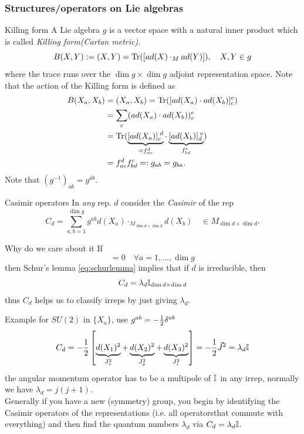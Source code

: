 \subsubsection{Structures/operators on Lie algebras}
\begin{mybox}{Killing form}
	A Lie algebra $g$ is a vector space with a natural inner product which is called \emph{Killing form(Cartan metric)}.
	\begin{equation}
		\label{eq:killingform}
		B(X,Y) := (X,Y) = \mathrm{Tr}([ad(X) \cdot_M ad(Y)]), \quad X,Y\in g
	\end{equation}
	where the trace runs over the $\dim g \times \dim g$ adjoint representation space. Note that the action of the Killing form is defined as
	\begin{align*}
		B(X_a,X_b) &= (X_a,X_b) = \mathrm{Tr}([ad(X_a) \cdot ad(X_b)]^e_c) \\
		&= \sum_e (ad(X_a) \cdot ad(X_b))^e_e \\
		&= \mathrm{Tr}(\underbrace{[ad(X_a)]^{\;d}_c}_{=f^d_{ac}} \cdot \underbrace{[ad(X_b)]^{\;e}_d}_{f^e_{bd}})\\
		&=f^d_{ac} f^c_{bd} =: g_{ab} = g_{ba}.
	\end{align*}
Note that $(g^{-1})_{ab} = g^{ab}$.
\end{mybox}
\begin{mybox}{Casimir operators}
	In \emph{any} rep. $d$ consider the \emph{Casimir} of the rep
	\begin{equation}
		\label{eq:casimir}
		C_d = \sum_{a,b=1}^{\dim g} g^{ab} d(X_a) \cdot_{M_{\dim d\times \dim d} } d(X_b) \quad \in M_{\dim d \times \dim d}.
	\end{equation}
\end{mybox}
\begin{mybox}{Why do we care about it}
	If
	\begin{equation}
		[C_d, d(X_a)] = 0 \quad \forall a=1,\dots,\dim g
	\end{equation}
	then Schur's lemma \ref{eq:schurlemma} implies that if $d$ is irreducible, then
	\begin{equation}
	C_d = \lambda_d \mathbb{I}_{\dim d\times \dim d}
	\end{equation}
	thus $C_d$ helps us to classify irreps by just giving $\lambda_d$.
\end{mybox}
Example for $SU(2)$ in $\{X_a\}$, use $g^{ab} = - \frac{1}{2} \delta^{ab}$
\begin{equation*}
	C_d = - \frac{1}{2} \left[\underbrace{d(X_1)^2}_{J^2_x} + \underbrace{d(X_2)^2}_{J^2_y}+\underbrace{d(X_3)^2}_{J^2_z}\right] = - \frac{1}{2} \vec{J}^2 = \lambda_d \mathbb{I}
\end{equation*}
the angular momentum operator has to be a multipole of $\mathbb{I}$ in any irrep, normally we have $\lambda_d = j(j+1)$.\\
Generally if you have a new (symmetry) group, you begin by identifying the Casimir operators of the representations (i.e. all operatorsthat commute with everything) and then find the quantum numbers $\lambda_d$ via $C_d = \lambda_d \mathbb{I}$.
